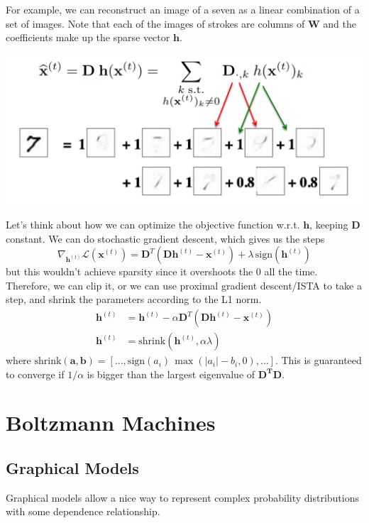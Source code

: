 \documentclass{article}
\begin{document}
    For example, we can reconstruct an image of a seven as a linear combination of a set of images. Note that each of the images of strokes are columns of $\mathbf{W}$ and the coefficients make up the sparse vector $\mathbf{h}$. 
    \begin{center}
        \includegraphics[scale=0.4]{img/06_Linear_Factor/sparse_coding.png}
    \end{center}
    Let's think about how we can optimize the objective function w.r.t. $\mathbf{h}$, keeping $\mathbf{D}$ constant. We can do stochastic gradient descent, which gives us the steps
    \[\nabla_{\mathbf{h}^{(t)}} \mathcal{L}(\mathbf{x}^{(t)}) = \mathbf{D}^T (\mathbf{D} \mathbf{h}^{(t)} - \mathbf{x}^{(t)}) + \lambda \, \mathrm{sign}(\mathbf{h}^{(t)})\]
    but this wouldn't achieve sparsity since it overshoots the $0$ all the time. Therefore, we can clip it, or we can use proximal gradient descent/ISTA to take a step, and shrink the parameters according to the L1 norm. 
    \begin{align*} 
        \mathbf{h}^{(t)} & = \mathbf{h}^{(t)} - \alpha \mathbf{D}^T (\mathbf{D} \mathbf{h}^{(t)} - \mathbf{x}^{(t)}) \\
        \mathbf{h}^{(t)} & = \mathrm{shrink}(\mathbf{h}^{(t)}, \alpha \lambda)
    \end{align*}
        where $\mathrm{shrink}(\mathbf{a}, \mathbf{b}) = [\ldots, \mathrm{sign}(a_i)\, \max(|a_i| - b_i, 0), \ldots]$. This is guaranteed to converge if $1/\alpha$ is bigger than the largest eigenvalue of $\mathbf{D^T} \mathbf{D}$.  

\section{Boltzmann Machines} 

  \subsection{Graphical Models}
    Graphical models allow a nice way to represent complex probability distributions with some dependence relationship. 
\end{document}
